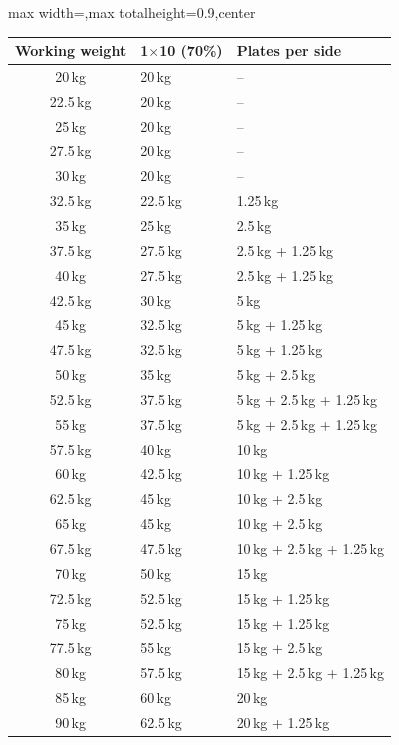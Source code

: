 \documentclass[11pt,a4paper]{article}
\newcommand{\tablearraystretch}{1.15}
\begin{document}
\begin{center}
\renewcommand{\arraystretch}{\tablearraystretch}
\begin{adjustbox}{max width=\linewidth,max totalheight=0.9\textheight,center}
\begin{tabular}{cll}
\toprule
Working weight & 1$\times$10 (70\%) & Plates per side \\
\midrule
20\,kg   & 20\,kg   & -- \\
22.5\,kg & 20\,kg   & -- \\
25\,kg   & 20\,kg   & -- \\
27.5\,kg & 20\,kg   & -- \\
30\,kg   & 20\,kg   & -- \\
32.5\,kg & 22.5\,kg & 1.25\,kg \\
35\,kg   & 25\,kg   & 2.5\,kg \\
37.5\,kg & 27.5\,kg & 2.5\,kg + 1.25\,kg \\
40\,kg   & 27.5\,kg & 2.5\,kg + 1.25\,kg \\
42.5\,kg & 30\,kg   & 5\,kg \\
45\,kg   & 32.5\,kg & 5\,kg + 1.25\,kg \\
47.5\,kg & 32.5\,kg & 5\,kg + 1.25\,kg \\
50\,kg   & 35\,kg   & 5\,kg + 2.5\,kg \\
52.5\,kg & 37.5\,kg & 5\,kg + 2.5\,kg + 1.25\,kg \\
55\,kg   & 37.5\,kg & 5\,kg + 2.5\,kg + 1.25\,kg \\
57.5\,kg & 40\,kg   & 10\,kg \\
60\,kg   & 42.5\,kg & 10\,kg + 1.25\,kg \\
62.5\,kg & 45\,kg   & 10\,kg + 2.5\,kg \\
65\,kg   & 45\,kg   & 10\,kg + 2.5\,kg \\
67.5\,kg & 47.5\,kg & 10\,kg + 2.5\,kg + 1.25\,kg \\
70\,kg   & 50\,kg   & 15\,kg \\
72.5\,kg & 52.5\,kg & 15\,kg + 1.25\,kg \\
75\,kg   & 52.5\,kg & 15\,kg + 1.25\,kg \\
77.5\,kg & 55\,kg   & 15\,kg + 2.5\,kg \\
80\,kg   & 57.5\,kg & 15\,kg + 2.5\,kg + 1.25\,kg \\
85\,kg   & 60\,kg   & 20\,kg \\
90\,kg   & 62.5\,kg & 20\,kg + 1.25\,kg \\
\bottomrule
\end{tabular}
\end{adjustbox}
\renewcommand{\arraystretch}{1}
\end{center}
\end{document}
